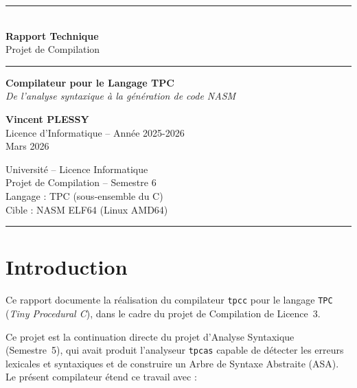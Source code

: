 \documentclass[12pt,a4paper]{article}
\newcommand{\tpc}{\texttt{TPC}}
\newcommand{\tpcc}{\texttt{tpcc}}
\begin{document}

\begin{titlepage}
\centering
\vspace*{2cm}

{\color{bleutpc}\rule{\linewidth}{1.5pt}}\\[0.4cm]
{\Huge\bfseries\color{bleutpc} Rapport Technique}\\[0.3cm]
{\large\color{gristpc} Projet de Compilation}\\[0.1cm]
{\color{bleutpc}\rule{\linewidth}{1.5pt}}

\vspace{1.5cm}

{\LARGE\bfseries Compilateur pour le Langage TPC}\\[0.5cm]
{\large\textit{De l'analyse syntaxique à la génération de code NASM}}

\vspace{2cm}

{\large\bfseries Vincent PLESSY}\\[0.3cm]
{\normalsize Licence d'Informatique – Année 2025-2026}\\[0.2cm]
{\normalsize Mars 2026}

\vfill

{\small\color{gristpc}
  Université – Licence Informatique\\
  Projet de Compilation – Semestre 6\\
  Langage : TPC (sous-ensemble du C)\\
  Cible : NASM ELF64 (Linux AMD64)
}

\vspace{1cm}
{\color{bleutpc}\rule{\linewidth}{0.4pt}}
\end{titlepage}

\tableofcontents
\newpage

\section{Introduction}

Ce rapport documente la réalisation du compilateur \tpcc{} pour le langage \tpc{}
(\textit{Tiny Procedural C}), dans le cadre du projet de Compilation de Licence~3.

Ce projet est la continuation directe du projet d'Analyse Syntaxique (Semestre~5),
qui avait produit l'analyseur \texttt{tpcas} capable de détecter les erreurs
lexicales et syntaxiques et de construire un Arbre de Syntaxe Abstraite (ASA).
Le présent compilateur étend ce travail avec :
\end{document}
